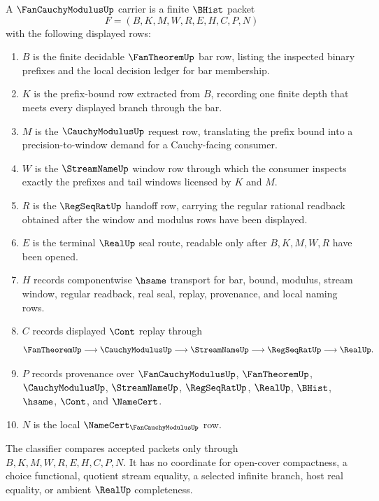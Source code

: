\begin{definition}
\label{def:fan-cauchy-modulus-carrier}
A $\FanCauchyModulusUp$ carrier is a finite $\BHist$ packet
$$
F=(B,K,M,W,R,E,H,C,P,N)
$$
with the following displayed rows:
\begin{enumerate}
\item $B$ is the finite decidable $\FanTheoremUp$ bar row, listing the inspected binary prefixes and the local decision ledger for bar membership.
\item $K$ is the prefix-bound row extracted from $B$, recording one finite depth that meets every displayed branch through the bar.
\item $M$ is the $\CauchyModulusUp$ request row, translating the prefix bound into a precision-to-window demand for a Cauchy-facing consumer.
\item $W$ is the $\StreamNameUp$ window row through which the consumer inspects exactly the prefixes and tail windows licensed by $K$ and $M$.
\item $R$ is the $\RegSeqRatUp$ handoff row, carrying the regular rational readback obtained after the window and modulus rows have been displayed.
\item $E$ is the terminal $\RealUp$ seal route, readable only after $B,K,M,W,R$ have been opened.
\item $H$ records componentwise $\hsame$ transport for bar, bound, modulus, stream window, regular readback, real seal, replay, provenance, and local naming rows.
\item $C$ records displayed $\Cont$ replay through
$$
\FanTheoremUp\longrightarrow \CauchyModulusUp\longrightarrow \StreamNameUp\longrightarrow \RegSeqRatUp\longrightarrow \RealUp .
$$
\item $P$ records provenance over $\FanCauchyModulusUp$, $\FanTheoremUp$, $\CauchyModulusUp$, $\StreamNameUp$, $\RegSeqRatUp$, $\RealUp$, $\BHist$, $\hsame$, $\Cont$, and $\NameCert$.
\item $N$ is the local $\NameCert_{\FanCauchyModulusUp}$ row.
\end{enumerate}
The classifier compares accepted packets only through $B,K,M,W,R,E,H,C,P,N$. It has no coordinate for open-cover compactness, a choice functional, quotient stream equality, a selected infinite branch, host real equality, or ambient $\RealUp$ completeness.
\end{definition}

